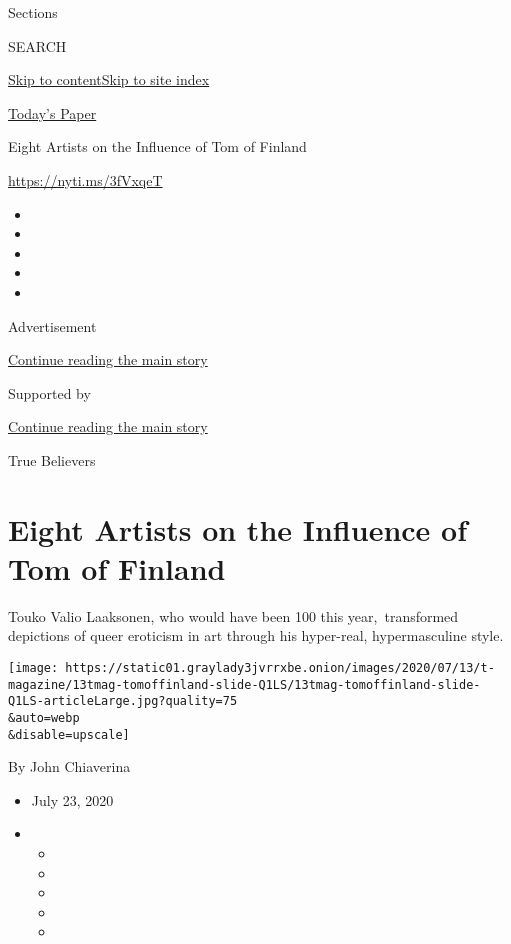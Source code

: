 Sections

SEARCH

\protect\hyperlink{site-content}{Skip to
content}\protect\hyperlink{site-index}{Skip to site index}

\href{https://myaccount.nytimes3xbfgragh.onion/auth/login?response_type=cookie\&client_id=vi}{}

\href{https://www.nytimes3xbfgragh.onion/section/todayspaper}{Today's
Paper}

Eight Artists on the Influence of Tom of Finland

\url{https://nyti.ms/3fVxqeT}

\begin{itemize}
\item
\item
\item
\item
\item
\end{itemize}

Advertisement

\protect\hyperlink{after-top}{Continue reading the main story}

Supported by

\protect\hyperlink{after-sponsor}{Continue reading the main story}

True Believers

\hypertarget{eight-artists-on-the-influence-of-tom-of-finland}{%
\section{Eight Artists on the Influence of Tom of
Finland}\label{eight-artists-on-the-influence-of-tom-of-finland}}

Touko Valio Laaksonen, who would have been 100 this year,~transformed
depictions of queer eroticism in art through his hyper-real,
hypermasculine style.

\texttt{[image: https://static01.graylady3jvrrxbe.onion/images/2020/07/13/t-magazine/13tmag-tomoffinland-slide-Q1LS/13tmag-tomoffinland-slide-Q1LS-articleLarge.jpg?quality=75\\\&auto=webp\\\&disable=upscale]}

By John Chiaverina

\begin{itemize}
\item
  July 23, 2020
\item
  \begin{itemize}
  \item
  \item
  \item
  \item
  \item
  \end{itemize}
\end{itemize}

